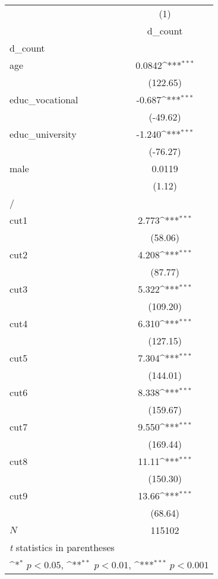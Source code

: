 {
\def\sym#1{\ifmmode^{#1}\else\(^{#1}\)\fi}
\begin{tabular}{l*{1}{c}}
\hline\hline
            &\multicolumn{1}{c}{(1)}\\
            &\multicolumn{1}{c}{d\_count}\\
\hline
d\_count     &                     \\
age         &      0.0842\sym{***}\\
            &    (122.65)         \\
[1em]
educ\_vocational&      -0.687\sym{***}\\
            &    (-49.62)         \\
[1em]
educ\_university&      -1.240\sym{***}\\
            &    (-76.27)         \\
[1em]
male        &      0.0119         \\
            &      (1.12)         \\
\hline
/           &                     \\
cut1        &       2.773\sym{***}\\
            &     (58.06)         \\
[1em]
cut2        &       4.208\sym{***}\\
            &     (87.77)         \\
[1em]
cut3        &       5.322\sym{***}\\
            &    (109.20)         \\
[1em]
cut4        &       6.310\sym{***}\\
            &    (127.15)         \\
[1em]
cut5        &       7.304\sym{***}\\
            &    (144.01)         \\
[1em]
cut6        &       8.338\sym{***}\\
            &    (159.67)         \\
[1em]
cut7        &       9.550\sym{***}\\
            &    (169.44)         \\
[1em]
cut8        &       11.11\sym{***}\\
            &    (150.30)         \\
[1em]
cut9        &       13.66\sym{***}\\
            &     (68.64)         \\
\hline
\(N\)       &      115102         \\
\hline\hline
\multicolumn{2}{l}{\footnotesize \textit{t} statistics in parentheses}\\
\multicolumn{2}{l}{\footnotesize \sym{*} \(p<0.05\), \sym{**} \(p<0.01\), \sym{***} \(p<0.001\)}\\
\end{tabular}
}
